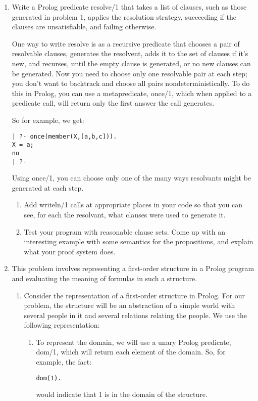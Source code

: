 \begin{enumerate}
\item
Write a Prolog predicate resolve/1 that takes a list of clauses,
such as those generated in problem 1, applies the resolution strategy,
succeeding if the clauses are unsatisfiable, and failing otherwise.

One way to write resolve is as a recursive predicate that chooses a
pair of resolvable clauses, generates the resolvent, adds it to the
set of clauses if it's new, and recurses, until the empty clause is
generated, or no new clauses can be generated.  Now you need to choose
only one resolvable pair at each step; you don't want to backtrack and
choose all pairs nondeterministically.  To do this in Prolog, you can
use a metapredicate, once/1, which when applied to a predicate call,
will return only the first answer the call generates.

So for example, we get:
\begin{verbatim}
| ?- once(member(X,[a,b,c])).
X = a;
no
| ?- 
\end{verbatim}

Using once/1, you can choose only one of the many ways resolvants
might be generated at each step.

\begin{enumerate}
\item
Add writeln/1 calls at appropriate places in your code so that you can
see, for each the resolvant, what clauses were used to generate it.
\item
Test your program with reasonable clause sets.  Come up with an
interesting example with some semantics for the propositions, and
explain what your proof system does.
\end{enumerate}

\item
This problem involves representing a first-order structure in a Prolog
program and evaluating the meaning of formulas in such a structure.

\begin{enumerate}
\item
Consider the representation of a first-order structure in Prolog.  For
our problem, the structure will be an abstraction of a simple world
with several people in it and several relations relating the people.
We use the following representation:

\begin{enumerate}

\item
To represent the domain, we will use a unary Prolog predicate,
dom/1, which will return each element of the domain.
So, for example, the fact:
\begin{verbatim}
dom(1).
\end{verbatim}
would indicate that 1 is in the domain of the structure.


\end{enumerate}
\end{enumerate}
\end{enumerate}

